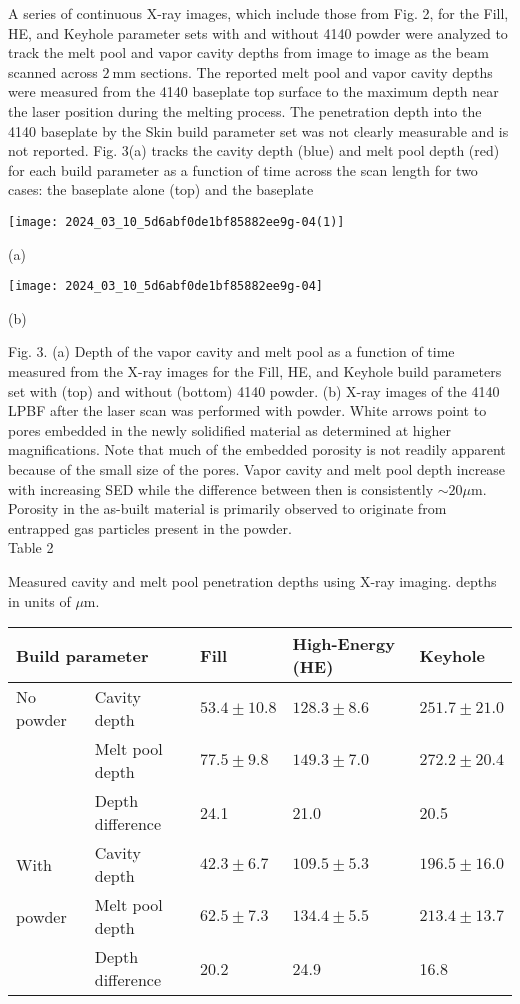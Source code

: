 \documentclass[10pt]{article}
\begin{document}
A series of continuous X-ray images, which include those from Fig. 2, for the Fill, HE, and Keyhole parameter sets with and without 4140 powder were analyzed to track the melt pool and vapor cavity depths from image to image as the beam scanned across $2 \mathrm{~mm}$ sections. The reported melt pool and vapor cavity depths were measured from the 4140 baseplate top surface to the maximum depth near the laser position during the melting process. The penetration depth into the 4140 baseplate by the Skin build parameter set was not clearly measurable and is not reported. Fig. 3(a) tracks the cavity depth (blue) and melt pool depth (red) for each build parameter as a function of time across the scan length for two cases: the baseplate alone (top) and the baseplate

\begin{center}
\texttt{[image: 2024\_03\_10\_5d6abf0de1bf85882ee9g-04(1)]}
\end{center}

(a)

\begin{center}
\texttt{[image: 2024\_03\_10\_5d6abf0de1bf85882ee9g-04]}
\end{center}

(b)

Fig. 3. (a) Depth of the vapor cavity and melt pool as a function of time measured from the X-ray images for the Fill, HE, and Keyhole build parameters set with (top) and without (bottom) 4140 powder. (b) X-ray images of the 4140 LPBF after the laser scan was performed with powder. White arrows point to pores embedded in the newly solidified material as determined at higher magnifications. Note that much of the embedded porosity is not readily apparent because of the small size of the pores. Vapor cavity and melt pool depth increase with increasing SED while the difference between then is consistently $\sim 20 \mu \mathrm{m}$. Porosity in the as-built material is primarily observed to originate from entrapped gas particles present in the powder.\\
Table 2

Measured cavity and melt pool penetration depths using X-ray imaging. depths in units of $\mu \mathrm{m}$.

\begin{center}
\begin{tabular}{lllll}
\hline
\multicolumn{2}{l}{Build parameter} & Fill & High-Energy (HE) & Keyhole \\
\hline
No powder & Cavity depth & $53.4 \pm 10.8$ & $128.3 \pm 8.6$ & $251.7 \pm 21.0$ \\
 & Melt pool depth & $77.5 \pm 9.8$ & $149.3 \pm 7.0$ & $272.2 \pm 20.4$ \\
 & Depth difference & 24.1 & 21.0 & 20.5 \\
With & Cavity depth & $42.3 \pm 6.7$ & $109.5 \pm 5.3$ & $196.5 \pm 16.0$ \\
powder & Melt pool depth & $62.5 \pm 7.3$ & $134.4 \pm 5.5$ & $213.4 \pm 13.7$ \\
 & Depth difference & 20.2 & 24.9 & 16.8 \\
\hline
\end{tabular}
\end{center}
\end{document}
